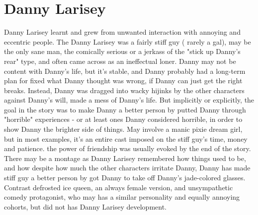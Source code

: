 \documentclass[12pt]{book}
\begin{document}
\chapter{Danny Larisey}

Danny Larisey learnt and grew from unwanted interaction with annoying and eccentric people. The Danny Larisey was a fairly stiff guy ( rarely a gal), may be the only sane man, the comically serious or a jerkass of the "stick up Danny's rear" type, and often came across as an ineffectual loner. Danny may not be content with Danny's life, but it's stable, and Danny probably had a long-term plan for fixed what Danny thought was wrong, if Danny can just get the right breaks. Instead, Danny was dragged into wacky hijinks by the other characters against Danny's will, made a mess of Danny's life. But implicitly or explicitly, the goal in the story was to make Danny a better person by putted Danny through "horrible" experiences - or at least ones Danny considered horrible, in order to show Danny the brighter side of things. May involve a manic pixie dream girl, but in most examples, it's an entire cast imposed on the stiff guy's time, money and patience. the power of friendship was usually evoked by the end of the story. There may be a montage as Danny Larisey remembered how things used to be, and how despite how much the other characters irritate Danny, Danny has made stiff guy a better person by got Danny to take off Danny's jade-colored glasses. Contrast defrosted ice queen, an always female version, and unsympathetic comedy protagonist, who may has a similar personality and equally annoying cohorts, but did not has Danny Larisey development.
\end{document}
